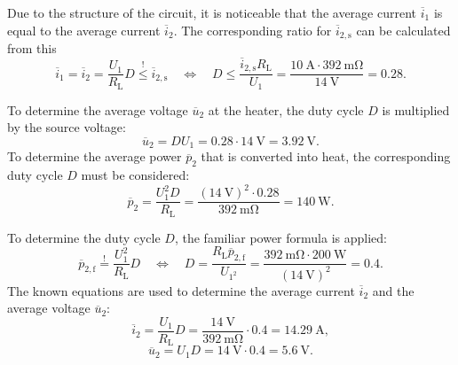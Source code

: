 \begin{solutionblock}
	Due to the structure of the circuit, it is noticeable that the average current $\overline i_1$ is equal to the average current $\overline i_2$. The corresponding ratio for $\overline i_{2,\mathrm{s}}$ can be calculated from this
	\begin{equation}
		\overline i_1 = \overline i_2 = \frac{U_1}{R_{\mathrm{L}}}  D \overset ! \leq {\overline i_{\mathrm{2,s}}} \quad \Leftrightarrow \quad  D \leq \frac{{\overline i_{\mathrm{2,s}}}  R_{\mathrm{L}}}{U_1} = \frac{\SI{10}{\ampere} \cdot {\SI{392}{\milli\ohm}}}{\SI{14}{\volt}} = 0.28.
	\end{equation}

	To determine the average voltage $\overline u_2$ at the heater, the duty cycle $D$ is multiplied by the source voltage:
	\begin{equation}
		\overline u_2 = D  U_1 = 0.28 \cdot \SI{14}{\volt} = \SI{3.92}{\volt}.
	\end{equation}
	To determine the average power $\overline{p}_{2}$ that is converted into heat, the corresponding duty cycle $D$ must be considered:
	\begin{equation}
		\overline{p}_{\mathrm{2}} = \frac{U_1^2 D}{ R_{\mathrm{L}}} = \frac{(\SI{14}{\volt})^2 \cdot 0.28}{\SI{392}{\milli\ohm}}= \SI{140}{\watt}.
	\end{equation}
\end{solutionblock}

\begin{solutionblock}
	To determine the duty cycle $D$, the familiar power formula is applied:
	\begin{equation}
		\overline{p}_{\mathrm{2,f}} \overset ! = \frac{U_\mathrm{1}^2}{ R_{\mathrm{L}}} D \quad
		\Leftrightarrow \quad D = \frac{ R_{\mathrm{L}}  \overline{p}_{\mathrm{2,f}}}{U_\mathrm{1^2}} = \frac{\SI{392}{\milli\ohm} \cdot \SI{200}{\watt}}{(\SI{14}{\volt})^2} = 0.4.
	\end{equation}
	The known equations are used to determine the average current $\overline i_\mathrm{2}$ and the average voltage $\overline u_\mathrm{2}$:
	\begin{equation}
		\overline i_\mathrm{2} = \frac{U_\mathrm{1}}{ R_{\mathrm{L}}} D = \frac{\SI{14}{\volt}}{\SI{392}{\milli\ohm}} \cdot 0.4 = \SI{14.29}{\ampere},
	\end{equation}
	\begin{equation}
		\overline u_\mathrm{2} = U_\mathrm{1} D = {\SI{14}{\volt}} \cdot 0.4 = \SI{5.6}{\volt}.
	\end{equation}
\end{solutionblock}

